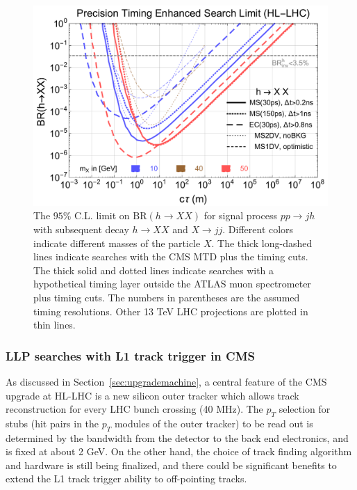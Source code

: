 \begin{figure}[t]
    \centering
    \includegraphics[width=1.0\columnwidth]{figures/MTD/10-20-50-MC-Lcalc-BRlimit-with-deltaT-cut-MS-1ns.pdf} 
    \caption{The $95\%$ C.L. limit on $\text{BR}(h \to XX)$ for signal process $pp \to j h$ with subsequent decay 
    $h\to X X$ and $X \to j j$. Different colors indicate different masses of the particle $X$. 
    The thick long-dashed lines indicate searches with the CMS MTD plus the timing cuts. 
    The thick solid and dotted lines indicate searches with a hypothetical timing layer outside the ATLAS muon spectrometer plus timing cuts.
    The numbers in parentheses are 
    the assumed timing resolutions. Other 13 TeV LHC projections \cite{Coccaro:2016lnz, Bernaciak:2014pna} are plotted in thin lines.
    }
    \label{fig:ctaulimitHiggs}
\end{figure}


\subsubsection{LLP searches with L1 track trigger in CMS}

As discussed in Section~\ref{sec:upgrademachine}, a central feature of the CMS upgrade at HL-LHC is a new silicon outer tracker which allows track reconstruction for every LHC bunch crossing (40 MHz). 
The $p_T$ selection for stubs (hit pairs in the $p_T$ modules of the outer tracker) to be read out is determined by the bandwidth from the detector 
to the back end electronics, and is fixed at about 2 GeV. 
On the other hand, the choice of track finding algorithm and hardware is still being finalized, and there could be significant benefits to extend the L1 track trigger ability to off-pointing tracks. 

